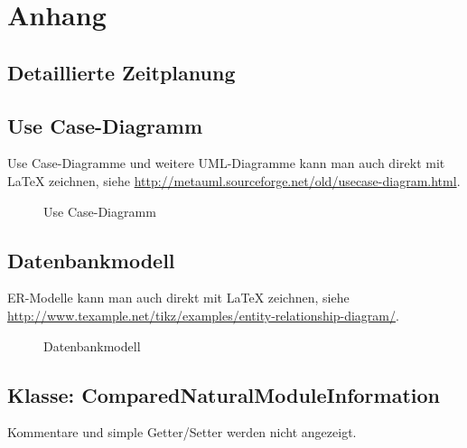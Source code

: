 \section{Anhang}


\clearpage




\subsection{Detaillierte Zeitplanung}
\label{app:Zeitplanung}



\clearpage

\subsection{Use Case-Diagramm}
\label{app:UseCase}
Use Case-Diagramme und weitere \acs{UML}-Diagramme kann man auch direkt mit \LaTeX{} zeichnen, siehe \zB \url{http://metauml.sourceforge.net/old/usecase-diagram.html}.
\begin{figure}[htb]
\centering
{}
\caption{Use Case-Diagramm}
\end{figure}



\subsection{Datenbankmodell}
\label{app:Datenbankmodell}
ER-Modelle kann man auch direkt mit \LaTeX{} zeichnen, siehe \zB \url{http://www.texample.net/tikz/examples/entity-relationship-diagram/}.
\begin{figure}[htb]
\centering
{}
\caption{Datenbankmodell}
\end{figure}
\clearpage


\clearpage

\clearpage


\subsection{Klasse: ComparedNaturalModuleInformation}
\label{app:CNMI}
Kommentare und simple Getter/Setter werden nicht angezeigt.

\clearpage

